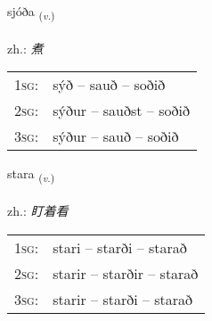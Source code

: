 \documentclass[frontgrid, backgrid]{flacards}\usepackage[]{graphicx}\usepackage[]{xcolor}
\begin{document}
\renewcommand{\flhead}{\vskip5pt \fboxsep=0pt {\small\bfseries\footnotesize Sagnorð | 动词}}
\renewcommand{\fcfoot}{\vskip5pt \fboxsep=0pt \hspace{2pt}{\small\bfseries\footnotesize 3K}}

\renewcommand{\blhead}{\vskip5pt {\small\bfseries\footnotesize Sagnorð | 动词 }}
\renewcommand{\bcfoot}{\vskip5pt \hspace{2pt}{\small\bfseries\footnotesize 3K}}


{sjóða \small{\textsubscript{(\textit{v.})}} \\[1ex] %
\textphonetic{[sjouːða]} \\
zh.: \emph{煮} \\  [2ex]
\renewcommand*{\arraystretch}{0.8}
\begin{tabular}{p{1cm}l}
\textsc{1sg}: & sýð -- sauð -- soðið \\ 
\textsc{2sg}: & sýður -- sauðst -- soðið \\ 
\textsc{3sg}: & sýður -- sauð -- soðið \\ 
\end{tabular}
}

\renewcommand{\flhead}{\vskip5pt \fboxsep=0pt {\small\bfseries\footnotesize Sagnorð | 动词}}
\renewcommand{\fcfoot}{\vskip5pt \fboxsep=0pt \hspace{2pt}{\small\bfseries\footnotesize 3K}}

\renewcommand{\blhead}{\vskip5pt {\small\bfseries\footnotesize Sagnorð | 动词 }}
\renewcommand{\bcfoot}{\vskip5pt \hspace{2pt}{\small\bfseries\footnotesize 3K}}


{stara \small{\textsubscript{(\textit{v.})}} \\[1ex] %
\textphonetic{[staːra]} \\
zh.: \emph{盯着看} \\  [2ex]
\renewcommand*{\arraystretch}{0.8}
\begin{tabular}{p{1cm}l}
\textsc{1sg}: & stari -- starði -- starað \\ 
\textsc{2sg}: & starir -- starðir -- starað \\ 
\textsc{3sg}: & starir -- starði -- starað \\ 
\end{tabular}
}
\end{document}
